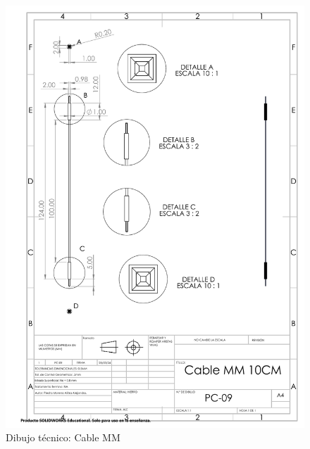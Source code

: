 \begin{figure}[H]
    \centering
    \includegraphics[trim = {7mm 1mm 1mm 1mm},clip,scale=0.4]{22/img/cableMMDibujo.PDF}
    \caption{Dibujo técnico: Cable MM}
    \label{fig:enter-label9}
\end{figure}

